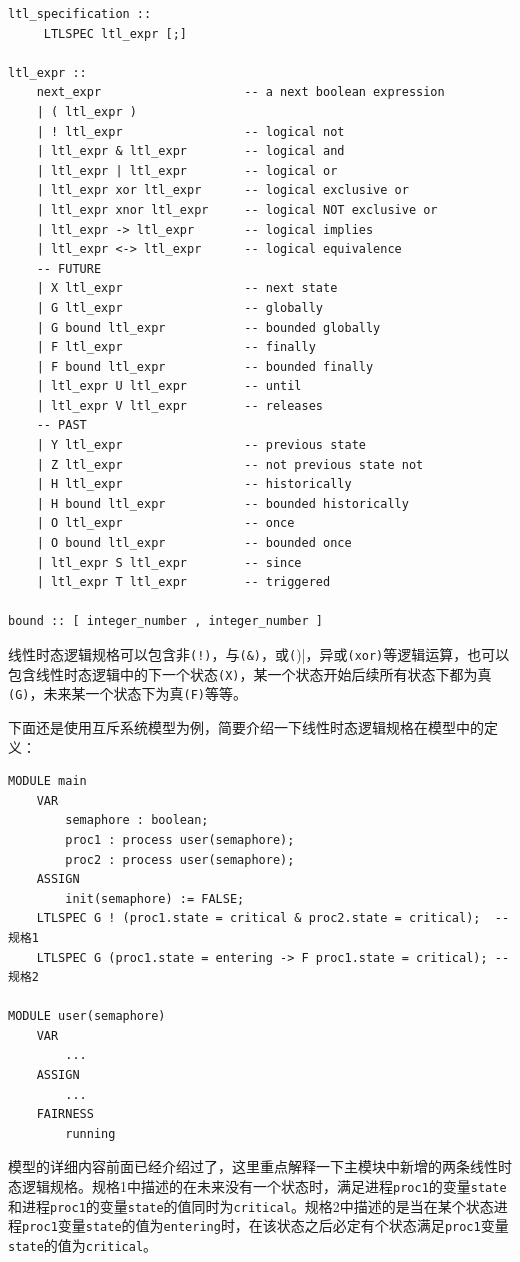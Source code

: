 \begin{lstlisting}
ltl_specification ::
     LTLSPEC ltl_expr [;]

ltl_expr ::
    next_expr                    -- a next boolean expression
    | ( ltl_expr )
    | ! ltl_expr                 -- logical not
    | ltl_expr & ltl_expr        -- logical and
    | ltl_expr | ltl_expr        -- logical or
    | ltl_expr xor ltl_expr      -- logical exclusive or
    | ltl_expr xnor ltl_expr     -- logical NOT exclusive or
    | ltl_expr -> ltl_expr       -- logical implies
    | ltl_expr <-> ltl_expr      -- logical equivalence
    -- FUTURE
    | X ltl_expr                 -- next state
    | G ltl_expr                 -- globally
    | G bound ltl_expr           -- bounded globally
    | F ltl_expr                 -- finally
    | F bound ltl_expr           -- bounded finally
    | ltl_expr U ltl_expr        -- until
    | ltl_expr V ltl_expr        -- releases
    -- PAST
    | Y ltl_expr                 -- previous state
    | Z ltl_expr                 -- not previous state not
    | H ltl_expr                 -- historically
    | H bound ltl_expr           -- bounded historically
    | O ltl_expr                 -- once
    | O bound ltl_expr           -- bounded once
    | ltl_expr S ltl_expr        -- since
    | ltl_expr T ltl_expr        -- triggered

bound :: [ integer_number , integer_number ]
\end{lstlisting}

线性时态逻辑规格可以包含非\verb|(!)|，与\verb|(&)|，或\verb|(|)|，异或\verb|(xor)|等逻辑运算，也可以包含线性时态逻辑中的下一个状态\verb|(X)|，某一个状态开始后续所有状态下都为真\verb|(G)|，未来某一个状态下为真\verb|(F)|等等。

下面还是使用互斥系统模型为例，简要介绍一下线性时态逻辑规格在模型中的定义：

\begin{lstlisting}
MODULE main
    VAR
        semaphore : boolean;
        proc1 : process user(semaphore);
        proc2 : process user(semaphore);
    ASSIGN
        init(semaphore) := FALSE;
    LTLSPEC G ! (proc1.state = critical & proc2.state = critical);  --规格1
    LTLSPEC G (proc1.state = entering -> F proc1.state = critical); --规格2

MODULE user(semaphore)
    VAR
        ...
    ASSIGN
        ...
    FAIRNESS
        running
\end{lstlisting}

模型的详细内容前面已经介绍过了，这里重点解释一下主模块中新增的两条线性时态逻辑规格。规格1中描述的在未来没有一个状态时，满足进程\verb|proc1|的变量\verb|state|和进程\verb|proc1|的变量\verb|state|的值同时为\verb|critical|。规格2中描述的是当在某个状态进程\verb|proc1|变量\verb|state|的值为\verb|entering|时，在该状态之后必定有个状态满足\verb|proc1|变量\verb|state|的值为\verb|critical|。


